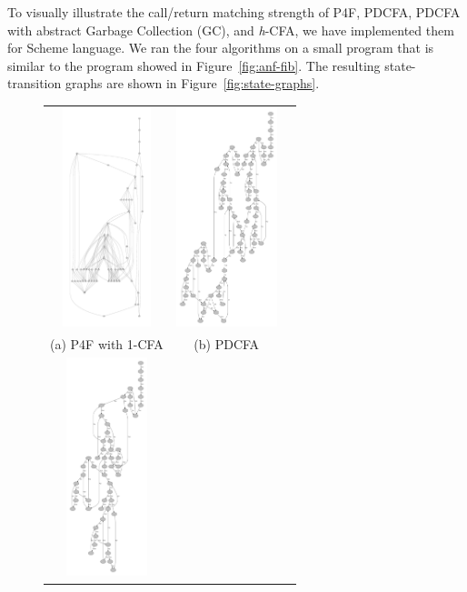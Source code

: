 \documentclass[12pt]{report}
\begin{document}
To visually illustrate the call/return matching strength of P4F, PDCFA, PDCFA with abstract Garbage Collection (GC), and \textit{h}-CFA, we have
implemented them for Scheme language. We ran the four algorithms on a small program that is similar to the program showed in Figure~\ref{fig:anf-fib}.
The resulting state-transition graphs are shown in Figure~\ref{fig:state-graphs}.
\begin{figure}
\begin{center}
\begin{tabular}{ccc}
\includegraphics[height=2.5in]{1p4f.pdf}
&
\includegraphics[height=2.5in]{pdcfaWOgc.pdf}
\\
(a) P4F with 1-CFA
&
(b) PDCFA
\\
\includegraphics[height=2.5in]{pdcfa.pdf}

\end{tabular}
\end{center}
\end{figure}
\end{document}
